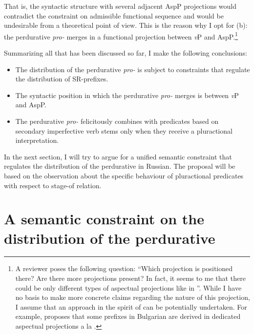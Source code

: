\documentclass[output=paper,
]{langscibook}
\begin{document}
\z

\noindent That is, the syntactic structure with several adjacent AspP projections would contradict the constraint on admissible functional sequence and would be undesirable from a theoretical point of view. This is the reason why I opt for (b): the perdurative \textit{pro-} merges in a functional projection between \textit{v}P and AspP.\footnote{A reviewer poses the following question: ``Which projection is positioned there? Are there more projections present? In fact, it seems to me that there could be only different types of aspectual projections like in \citet{cinque1999}''. While I have no basis to make more concrete claims regarding the nature of this projection, I assume that an approach in the spirit of \citet{cinque1999} can be potentially undertaken. For example, \citet{markova2011} proposes that some prefixes in Bulgarian are derived in dedicated aspectual projections a la \citet{cinque1999}.}

Summarizing all that has been discussed so far, I make the following conclusions:

\begin{itemize}
    \item The distribution of the perdurative \textit{pro-} is subject to constraints that regulate the distribution of SR-prefixes.
\item The syntactic position in which the perdurative \textit{pro-} merges is between \textit{v}P and AspP.
\item The perdurative \textit{pro-} felicitously combines with predicates based on secondary imperfective verb stems only when they receive a pluractional interpretation.
\end{itemize}

\noindent In the next section, I will try to argue for a unified semantic constraint that regulates the distribution of the perdurative in Russian. The proposal will be based on the observation about the specific behaviour of pluractional predicates with respect to  stage-of relation.

\section{A semantic constraint on the distribution of the perdurative} \label{sec:naumov:3}
\end{document}
